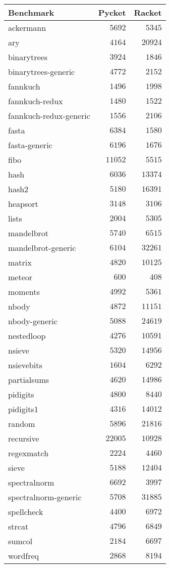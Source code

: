 \begin{table}[!tbp]
{\small
\begin{tabular}{l@{}r@{}r}
\toprule
\multicolumn{1}{l}{Benchmark}&\multicolumn{1}{c}{Pycket}&\multicolumn{1}{c}{Racket}\tabularnewline
\midrule
ackermann&$ 5692$&$ 5345$\tabularnewline
ary&$ 4164$&$20924$\tabularnewline
binarytrees&$ 3924$&$ 1846$\tabularnewline
binarytrees-generic&$ 4772$&$ 2152$\tabularnewline
fannkuch&$ 1496$&$ 1998$\tabularnewline
fannkuch-redux&$ 1480$&$ 1522$\tabularnewline
fannkuch-redux-generic&$ 1556$&$ 2106$\tabularnewline
fasta&$ 6384$&$ 1580$\tabularnewline
fasta-generic&$ 6196$&$ 1676$\tabularnewline
fibo&$11052$&$ 5515$\tabularnewline
hash&$ 6036$&$13374$\tabularnewline
hash2&$ 5180$&$16391$\tabularnewline
heapsort&$ 3148$&$ 3106$\tabularnewline
lists&$ 2004$&$ 5305$\tabularnewline
mandelbrot&$ 5740$&$ 6515$\tabularnewline
mandelbrot-generic&$ 6104$&$32261$\tabularnewline
matrix&$ 4820$&$10125$\tabularnewline
meteor&$  600$&$  408$\tabularnewline
moments&$ 4992$&$ 5361$\tabularnewline
nbody&$ 4872$&$11151$\tabularnewline
nbody-generic&$ 5088$&$24619$\tabularnewline
nestedloop&$ 4276$&$10591$\tabularnewline
nsieve&$ 5320$&$14956$\tabularnewline
nsievebits&$ 1604$&$ 6292$\tabularnewline
partialsums&$ 4620$&$14986$\tabularnewline
pidigits&$ 4800$&$ 8440$\tabularnewline
pidigits1&$ 4316$&$14012$\tabularnewline
random&$ 5896$&$21816$\tabularnewline
recursive&$22005$&$10928$\tabularnewline
regexmatch&$ 2224$&$ 4460$\tabularnewline
sieve&$ 5188$&$12404$\tabularnewline
spectralnorm&$ 6692$&$ 3997$\tabularnewline
spectralnorm-generic&$ 5708$&$31885$\tabularnewline
spellcheck&$ 4400$&$ 6972$\tabularnewline
strcat&$ 4796$&$ 6849$\tabularnewline
sumcol&$ 2184$&$ 6697$\tabularnewline
wordfreq&$ 2868$&$ 8194$\tabularnewline
\bottomrule
\end{tabular}}

\end{table}
